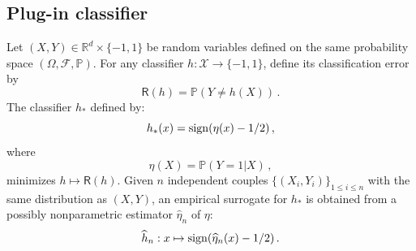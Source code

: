 \documentclass[a4paper,10pt,fleqn]{article}
\newcommand{\eqsp}{\,}
\newcommand{\calF}{\mathcal{F}}
\newcommand{\rset}{\ensuremath{\mathbb{R}}}
\newcommand{\bP}{\mathbb{P}}
\newcommand{\1}{\ensuremath{\mathbbm{1}}}
\begin{document}
\subsection{Plug-in classifier}
Let $(X,Y)\in\rset^d\times\{-1,1\}$ be random variables defined on the same probability space $(\Omega,\calF,\bP)$.
For any classifier $h:\mathcal{X}\to \{-1,1\}$, define its classification error by
$$
\mathsf{R}(h)=\bP(Y\neq h(X))\eqsp.
$$
The classifier $h_*$ defined by:
$$
h_{*}(x)={\rm sign}(\eta(x)-1/2)\eqsp,
$$
where
$$
\eta(X) = \bP(Y=1|X)\eqsp,
$$
minimizes $h\mapsto \mathsf{R}(h)$. Given $n$ independent couples $\{(X_i,Y_i)\}_{1\leqslant i \leqslant n}$ with the same distribution as $(X,Y)$, an empirical surrogate for $h_{*}$ is obtained from a possibly nonparametric estimator $\widehat \eta_n$ of $\eta$:
$$
\widehat h_n: x\mapsto {\rm sign}(\widehat \eta_n(x)-1/2)\eqsp.
$$
\end{document}

